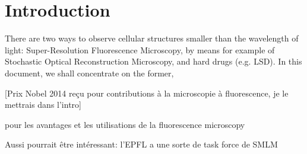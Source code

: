 \section{Introduction}
There are two ways to observe cellular structures smaller than the wavelength of light:
Super-Resolution Fluorescence Microscopy, by means for example of Stochastic Optical Reconstruction Microscopy, and hard drugs (e.g. LSD).
In this document, we shall concentrate on the former,

[Prix Nobel 2014 reçu pour contributions à la microscopie à fluorescence, je le mettrais dans l'intro]

\cite{sachl_introduction_2022} pour les avantages et les utilisations de la fluorescence microscopy

Aussi pourrait être intéressant: l'EPFL a une sorte de task force de SMLM